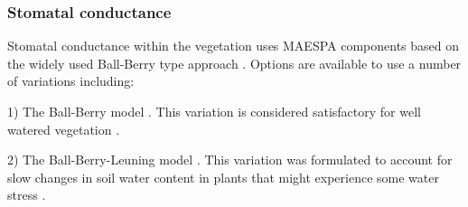 \documentclass[preprint,12pt,authoryear]{elsarticle}
\begin{document}

\subsubsection{Stomatal conductance}\label{Stomatalconductance}
Stomatal conductance within the vegetation uses MAESPA components based on the widely used Ball-Berry type approach \citep{Ball1987,Duursma2012}. Options are available to use a number of variations including:

%
%


1) The Ball-Berry model \citep{Ball1987}. This variation is considered satisfactory for well watered vegetation \citep{Tuzet2003}.
%

2) The Ball-Berry-Leuning model \citep{Leuning1995}. This variation was formulated to account for slow changes in soil water content in plants that might experience some water stress \citep{Wang1998,Tuzet2003}.

%
\end{document}
